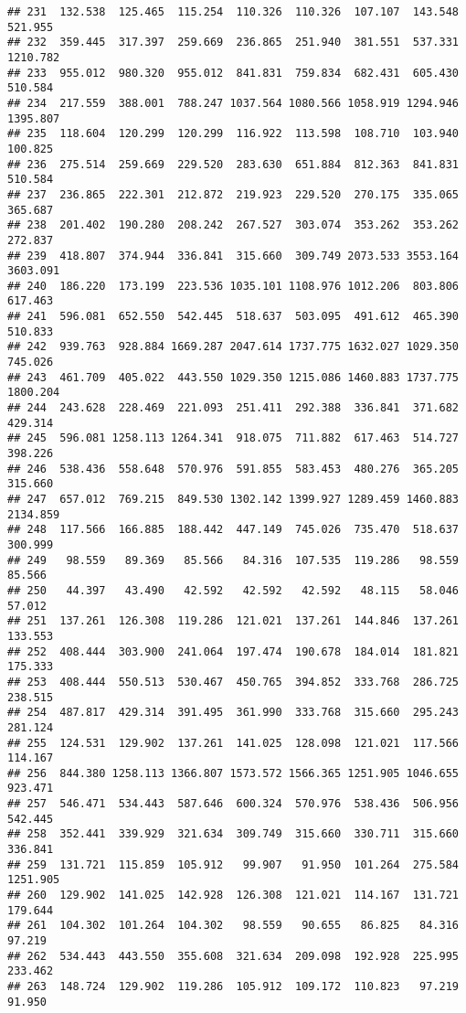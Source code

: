 \documentclass[
]{article}
\begin{document}
\begin{verbatim}
## 231  132.538  125.465  115.254  110.326  110.326  107.107  143.548  521.955
## 232  359.445  317.397  259.669  236.865  251.940  381.551  537.331 1210.782
## 233  955.012  980.320  955.012  841.831  759.834  682.431  605.430  510.584
## 234  217.559  388.001  788.247 1037.564 1080.566 1058.919 1294.946 1395.807
## 235  118.604  120.299  120.299  116.922  113.598  108.710  103.940  100.825
## 236  275.514  259.669  229.520  283.630  651.884  812.363  841.831  510.584
## 237  236.865  222.301  212.872  219.923  229.520  270.175  335.065  365.687
## 238  201.402  190.280  208.242  267.527  303.074  353.262  353.262  272.837
## 239  418.807  374.944  336.841  315.660  309.749 2073.533 3553.164 3603.091
## 240  186.220  173.199  223.536 1035.101 1108.976 1012.206  803.806  617.463
## 241  596.081  652.550  542.445  518.637  503.095  491.612  465.390  510.833
## 242  939.763  928.884 1669.287 2047.614 1737.775 1632.027 1029.350  745.026
## 243  461.709  405.022  443.550 1029.350 1215.086 1460.883 1737.775 1800.204
## 244  243.628  228.469  221.093  251.411  292.388  336.841  371.682  429.314
## 245  596.081 1258.113 1264.341  918.075  711.882  617.463  514.727  398.226
## 246  538.436  558.648  570.976  591.855  583.453  480.276  365.205  315.660
## 247  657.012  769.215  849.530 1302.142 1399.927 1289.459 1460.883 2134.859
## 248  117.566  166.885  188.442  447.149  745.026  735.470  518.637  300.999
## 249   98.559   89.369   85.566   84.316  107.535  119.286   98.559   85.566
## 250   44.397   43.490   42.592   42.592   42.592   48.115   58.046   57.012
## 251  137.261  126.308  119.286  121.021  137.261  144.846  137.261  133.553
## 252  408.444  303.900  241.064  197.474  190.678  184.014  181.821  175.333
## 253  408.444  550.513  530.467  450.765  394.852  333.768  286.725  238.515
## 254  487.817  429.314  391.495  361.990  333.768  315.660  295.243  281.124
## 255  124.531  129.902  137.261  141.025  128.098  121.021  117.566  114.167
## 256  844.380 1258.113 1366.807 1573.572 1566.365 1251.905 1046.655  923.471
## 257  546.471  534.443  587.646  600.324  570.976  538.436  506.956  542.445
## 258  352.441  339.929  321.634  309.749  315.660  330.711  315.660  336.841
## 259  131.721  115.859  105.912   99.907   91.950  101.264  275.584 1251.905
## 260  129.902  141.025  142.928  126.308  121.021  114.167  131.721  179.644
## 261  104.302  101.264  104.302   98.559   90.655   86.825   84.316   97.219
## 262  534.443  443.550  355.608  321.634  209.098  192.928  225.995  233.462
## 263  148.724  129.902  119.286  105.912  109.172  110.823   97.219   91.950

\end{verbatim}
\end{document}
